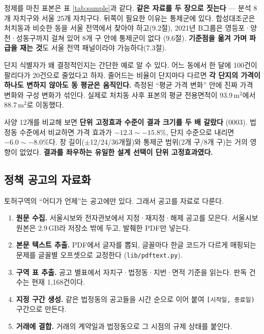 정제를 마친 표본은 표 \ref{tab:sample}과 같다. \textbf{같은 자료를 두 장으로
짓는다} --- 분석 8개 자치구와 서울 25개 자치구다. 뒤쪽이 필요한 이유는 통제군에
있다. 합성대조군은 처치동과 비슷한 동을 서울 전역에서 찾아야 하고(9.2절),
2021년 B그룹은 영등포·양천·성동구까지 걸쳐 있어 8개 구 안에 통제군이 없다
(9.6절). \textbf{기준점을 옮겨 가며 파급을 재는 것}도 서울 전역 패널이라야
가능하다(7.3절).



단지 식별자가 왜 결정적인지는 간단한 예로 알 수 있다. 어느 동에서 한 달에
100건이 팔리다가 20건으로 줄었다고 하자. 줄어드는 비율이 단지마다 다르면
\textbf{각 단지의 가격이 하나도 변하지 않아도 동 평균은 움직인다.} 측정된
``평균 가격 변화'' 안에 진짜 가격 변화와 구성 변화가 섞인다. 실제로 처치동
사후 표본의 평균 전용면적이 93.9\,m$^2$에서 88.7\,m$^2$로 이동했다.

사양 12개를 비교해 보면 \textbf{단위 고정효과 수준이 결과 크기를 두 배 갈랐다}
(0003). 법정동 수준에서 비교하면 가격 효과가 $-12.3 \sim -15.8\%$, 단지 수준으로
내리면 $-6.0 \sim -8.0\%$다. 창 길이($\pm$12/24/36개월)와 통제군 범위(2개 구/8개
구)는 거의 영향이 없었다. \textbf{결과를 좌우하는 유일한 설계 선택이 단위
고정효과였다.}

\subsection{정책 공고의 자료화}

토허구역의 ``어디가 언제''는 공고에만 있다. 그래서 공고를 자료로 다룬다.

\begin{enumerate}[leftmargin=2em, itemsep=2pt]
  \item \textbf{원문 수집.} 서울시보와 전자관보에서 지정·재지정·해제 공고를
        모은다. 서울시보 원본은 2.9\,GB라 저장소 밖에 두고, 발췌한 PDF만 넣는다.
  \item \textbf{본문 텍스트 추출.} PDF에서 글자를 뽑되, 글꼴마다 한글 코드가
        다르게 매핑되는 문제를 글꼴별 오프셋으로 교정한다
        (\texttt{lib/pdftext.py}).
  \item \textbf{구역 표 추출.} 공고 별표에서 자치구·법정동·지번·면적 기준을
        읽는다. 판독 건수는 현재 1,168건이다.
  \item \textbf{지정 구간 생성.} 같은 법정동의 공고들을 시간 순으로 이어 붙여
        \texttt{[시작일, 종료일)} 구간으로 만든다.
  \item \textbf{거래에 결합.} 거래의 계약일과 법정동으로 그 시점의 규제 상태를
        붙인다.
\end{enumerate}

